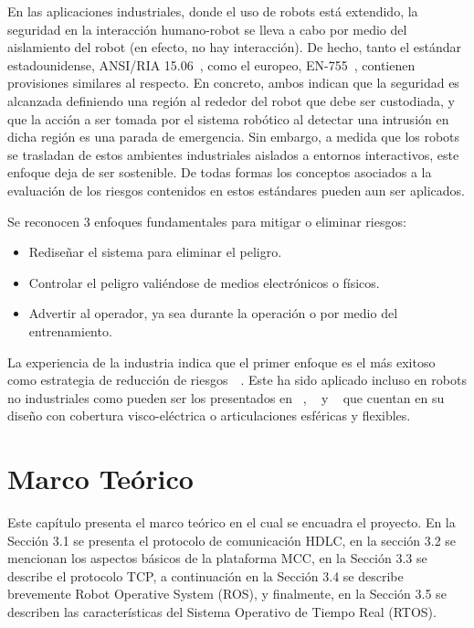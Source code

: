 \documentclass[withindex,glossary]{cam-thesis}
\begin{document}
En las aplicaciones industriales, donde el uso de robots está extendido, la seguridad en la interacción humano-robot se lleva a cabo por medio del aislamiento del robot (en efecto, no hay interacción). De hecho, tanto el estándar estadounidense, ANSI/RIA 15.06~\cite{ANSIRIA1506}, como el europeo, EN-755~\cite{Gaskill1996}, contienen provisiones similares al respecto. En concreto, ambos indican que la seguridad es alcanzada definiendo una región al rededor del robot que debe ser custodiada, y que la acción a ser tomada por el sistema robótico al detectar una intrusión en dicha región es una parada de emergencia. Sin embargo, a medida que los robots se trasladan de estos ambientes industriales aislados a entornos interactivos, este enfoque deja de ser sostenible. De todas formas los conceptos asociados a la evaluación de los riesgos contenidos en estos estándares pueden aun ser aplicados.

Se reconocen 3 enfoques fundamentales para mitigar o eliminar riesgos: 
\begin{itemize}
\item Rediseñar el sistema para eliminar el peligro.
\item Controlar el peligro valiéndose de medios electrónicos o físicos.
\item Advertir al operador, ya sea durante la operación o por medio del entrenamiento.
\end{itemize}

La experiencia de la industria indica que el primer enfoque es el más exitoso como estrategia de reducción de riesgos~\cite{ANSIRIA1506}~\cite{IEC61508}. Este ha sido aplicado incluso en robots no industriales como pueden ser los presentados en ~\cite{Yamada1997}, ~\cite{Yamada1999} y ~\cite{Bicchia} que cuentan en su diseño con cobertura visco-eléctrica o articulaciones esféricas y flexibles.

\chapter{Marco Teórico}
Este capítulo presenta el marco teórico en el cual se encuadra el proyecto. En la Sección 3.1 se presenta el protocolo de comunicación HDLC, en la sección 3.2 se mencionan los aspectos básicos de la plataforma MCC, en la Sección 3.3 se describe el protocolo TCP, a continuación en la Sección 3.4 se describe brevemente Robot Operative System (ROS), y finalmente, en la Sección 3.5 se describen las características del Sistema Operativo de Tiempo Real (RTOS).
\end{document}
